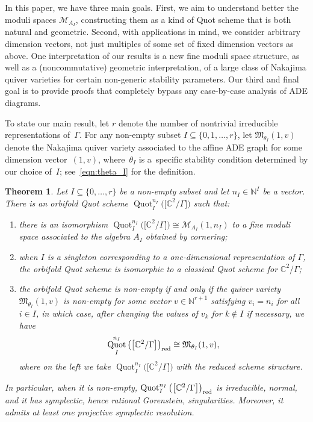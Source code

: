\documentclass[10pt,a4paper]{amsart}
\newtheorem{Theorem}{Theorem}[section]
\newcommand{\SC}{\mathbb{C}} %
\newcommand{\C}{\SC} %
\newcommand{\PiQ}{A}
\DeclareMathOperator{\Quot}{\mathrm{Quot}}
\newcommand{\QuotI}[1][ ]{\Quot_I^{#1}}
\newcommand{\QuotInI}{\QuotI[n_I]}
\numberwithin{equation}{section}
\begin{document}
In this paper, we have three main goals.
First, we aim to
understand better the moduli spaces $\mathcal{M}_{\PiQ_I}$,
constructing them as a kind of Quot scheme
that is both natural and geometric.
Second, with applications in mind, we consider arbitrary dimension vectors, not just multiples of some set of fixed dimension vectors as above. One interpretation of our results is a new fine moduli space structure, as well as a (noncommutative)
geometric interpretation, of a large class of
Nakajima quiver varieties for certain non-generic stability parameters.
Our third and final goal is to provide proofs that completely bypass any case-by-case analysis of ADE diagrams.

To state our main result,
let $r$ denote the number of nontrivial irreducible representations of~$\Gamma$.
For any non-empty subset $I\subseteq \{0,1,\dots,r\}$, let $\mathfrak{M}_{\theta_I}(1,v)$ denote the Nakajima quiver variety associated to the affine ADE graph for some dimension vector~$(1,v)$, where~$\theta_I$ is a~specific stability condition determined by our choice of~$I$; see~\eqref{eqn:theta_I} for the definition.


\begin{Theorem}\label{thm:mainintro}\label{mainthm}
Let $I\subseteq \{0,\ldots, r\}$ be a non-empty subset and
let $n_I\in {\mathbb N}^I$ be a vector. There is an orbifold Quot scheme $\QuotInI \big(\big[\SC^2/\Gamma\big]\big)$ such that:
\begin{enumerate}\itemsep=0pt
\item[$1)$] there is an isomorphism $\QuotInI \big(\big[\SC^2/\Gamma\big]\big) \cong \mathcal{M}_{\PiQ_I} (1,n_I)$ to a fine moduli space associated to the algebra $A_I$ obtained by cornering;
\item[$2)$] when $I$ is a singleton corresponding to a one-dimensional representation of $\Gamma$, the orbifold Quot scheme is isomorphic to a
classical Quot scheme for $\C^2/\Gamma$;
\item[$3)$]
the orbifold Quot scheme is non-empty if and only if the quiver variety $\mathfrak{M}_{\theta_I}(1,v)$ is non-empty for some vector
$v\in \mathbb{N}^{r+1}$ satisfying $v_i=n_i$ for all $i\in I$, in which case, after changing the values of $v_k$ for $k\not\in I$ if necessary, we have 
\[
\QuotInI \big(\big[\SC^2/\Gamma\big]\big)_{\rm red} \cong \mathfrak{M}_{\theta_I}(1,v),
\]
 where on the left we take $\QuotInI \big(\big[\SC^2/\Gamma\big]\big)$ with the reduced scheme structure.
\end{enumerate}
In particular, when it is non-empty, $\QuotInI \big(\big[\SC^2/\Gamma\big]\big)_{\rm red}$ is irreducible, normal, and it has symplectic, hence rational Gorenstein, singularities. Moreover, it admits at least one projective symplectic resolution.
\end{Theorem}
\end{document}
